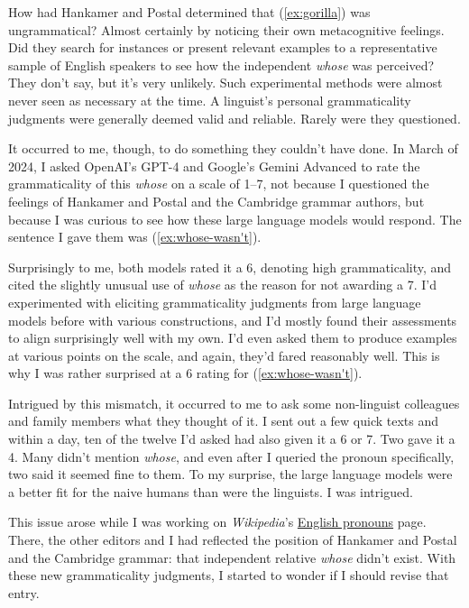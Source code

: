 How had Hankamer and Postal determined that (\ref{ex:gorilla}) was ungrammatical? Almost certainly by noticing their own metacognitive feelings. Did they search for instances or present relevant examples to a representative sample of English speakers to see how the independent \textit{whose} was perceived? They don't say, but it's very unlikely. Such experimental methods were almost never seen as necessary at the time. A linguist's personal  grammaticality judgments were generally deemed valid and reliable. Rarely were they questioned.

It occurred to me, though, to do something they couldn't have done. In March of 2024, I asked OpenAI's GPT-4 and Google's Gemini Advanced to rate the grammaticality of this \textit{whose} on a scale of 1--7, not because I questioned the feelings of Hankamer and Postal and the Cambridge grammar authors, but because I was curious to see how these large language models would respond. The sentence I gave them was (\ref{ex:whose-wasn't}).

 \label{ex:whose-wasn't}
\z

Surprisingly to me, both models rated it a 6, denoting high grammaticality, and cited the slightly unusual use of \textit{whose} as the reason for not awarding a 7. I'd experimented with eliciting grammaticality judgments from large language models before with various constructions, and I'd mostly found their assessments to align surprisingly well with my own. I'd even asked them to produce examples at various points on the scale, and again, they'd fared reasonably well. This is why I was rather surprised at a 6 rating for (\ref{ex:whose-wasn't}).

Intrigued by this mismatch, it occurred to me to ask some non-linguist colleagues and family members what they thought of it. I sent out a few quick texts and within a day, ten of the twelve I'd asked had also given it a 6 or 7. Two gave it a 4. Many didn't mention \textit{whose}, and even after I queried the pronoun specifically, two said it seemed fine to them. To my surprise, the large language models were a better fit for the naive humans than were the linguists. I was intrigued.

This issue arose while I was working on \textit{Wikipedia}'s \href{https://en.wikipedia.org/wiki/English_pronouns}{English pronouns} page. There, the other editors and I had reflected the position of Hankamer and Postal and the Cambridge grammar: that independent relative \textit{whose} didn't exist. With these new grammaticality judgments, I started to wonder if I should revise that entry.

